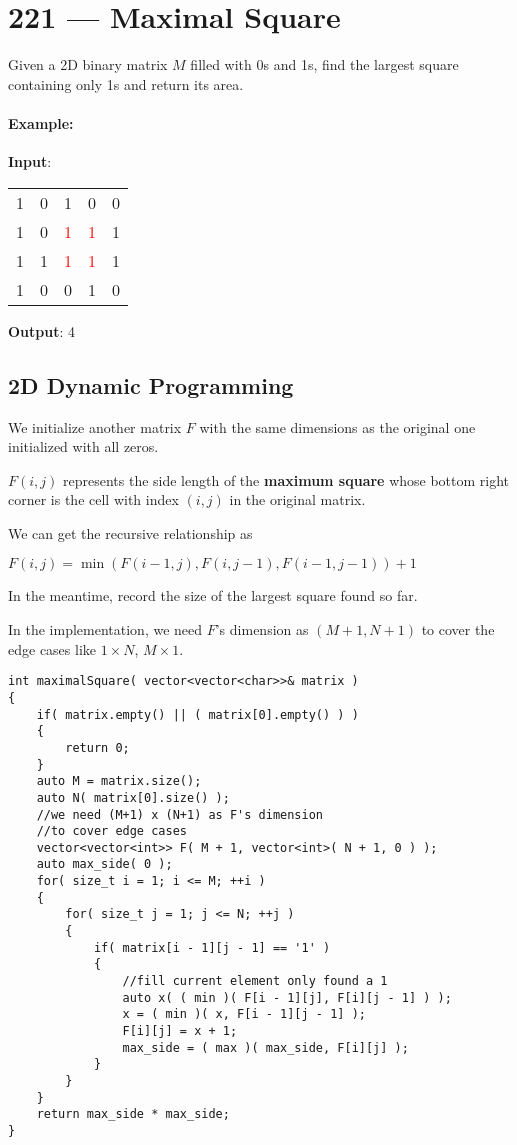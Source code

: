 \section{221 --- Maximal Square}
Given a 2D binary matrix $M$ filled with 0s and 1s, find the largest square containing only 1s and return its area.

\paragraph{Example:}

\begin{flushleft}
\textbf{Input}: 
\begin{table}[H]
\begin{tabular}{ccccc}
1 & 0 & 1 & 0 & 0 \\
1 & 0 & \textcolor{red}{1} & \textcolor{red}{1} & 1 \\
1 & 1 & \textcolor{red}{1} & \textcolor{red}{1} & 1 \\
1 & 0 & 0 & 1 & 0
\end{tabular}
\end{table}

\textbf{Output}: 4
\end{flushleft}

\subsection{2D Dynamic Programming}
We initialize another matrix $F$ with the same dimensions as the original one initialized with all zeros.

$F(i,j)$ represents the side length of the \textbf{maximum square} whose bottom right corner is the cell with index $ (i,j) $ in the original matrix.

We can get the recursive relationship as 

$F(i,j)=\min(F(i-1,j), F(i,j-1), F(i-1,j-1)) + 1$

In the meantime, record the size of the largest square found so far. 

In the implementation, we need $F$'s dimension as $(M+1, N+1)$ to cover the edge cases like $1\times N $, $M\times 1$.

\setcounter{lstlisting}{0}
\begin{lstlisting}[style=customc, caption={2D DP}]
int maximalSquare( vector<vector<char>>& matrix )
{
    if( matrix.empty() || ( matrix[0].empty() ) )
    {
        return 0;
    }
    auto M = matrix.size();
    auto N( matrix[0].size() );
    //we need (M+1) x (N+1) as F's dimension
    //to cover edge cases
    vector<vector<int>> F( M + 1, vector<int>( N + 1, 0 ) );
    auto max_side( 0 );
    for( size_t i = 1; i <= M; ++i )
    {
        for( size_t j = 1; j <= N; ++j )
        {
            if( matrix[i - 1][j - 1] == '1' )
            {
                //fill current element only found a 1
                auto x( ( min )( F[i - 1][j], F[i][j - 1] ) );
                x = ( min )( x, F[i - 1][j - 1] );
                F[i][j] = x + 1;
                max_side = ( max )( max_side, F[i][j] );
            }
        }
    }
    return max_side * max_side;
}
\end{lstlisting}

